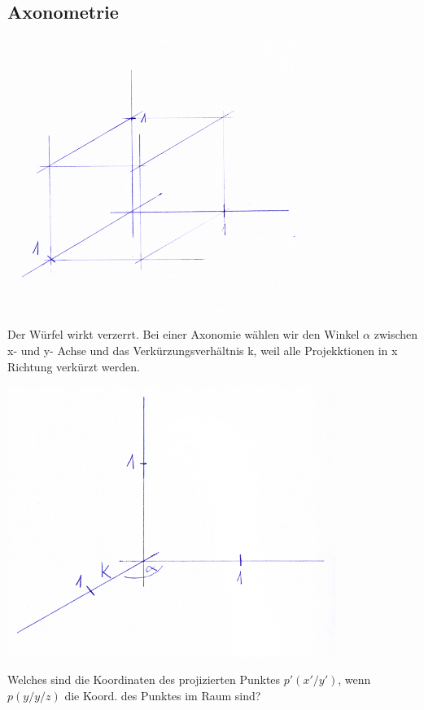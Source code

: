 \documentclass[a4paper,10pt]{report}
\begin{document}
\subsection{Axonometrie}
\begin{center}
	 \includegraphics[width=0.7\textwidth]{imgs/axonometrie1.png}
 \end{center}
Der Würfel wirkt verzerrt.
\newpage
\noindent
Bei einer Axonomie wählen wir den Winkel $\alpha$ zwischen  x- und y- Achse und das Verkürzungsverhältnis k, weil alle Projekktionen in x Richtung verkürzt werden.
\begin{center}
	 \includegraphics[width=0.8\textwidth]{imgs/axonometrie2.png}
 \end{center}
\newpage
\noindent
Welches sind die Koordinaten des projizierten Punktes $p'(x'/y')$, wenn $p(y/y/z)$ die Koord. des Punktes im Raum sind?
\end{document}
